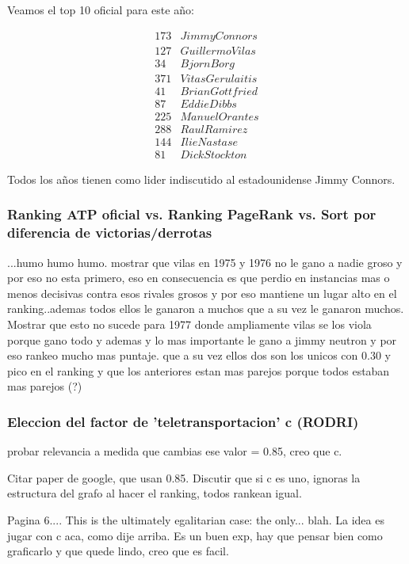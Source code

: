 Veamos el top 10 oficial para este año:

\begin{eqnarray*}
173 & Jimmy Connors \\
127 & Guillermo Vilas \\
34 & Bjorn Borg \\
371 & Vitas Gerulaitis \\
41 & Brian Gottfried \\
87 & Eddie Dibbs \\
225 & Manuel Orantes \\
288 & Raul Ramirez \\
144 & Ilie Nastase \\
81 & Dick Stockton 
\end{eqnarray*}

Todos los años tienen como lider indiscutido al estadounidense Jimmy Connors.

\subsubsection{Ranking ATP oficial vs. Ranking PageRank vs. Sort por diferencia de victorias/derrotas}


...humo humo humo. mostrar que vilas en 1975 y 1976 no le gano a nadie groso y por eso no esta primero, eso en consecuencia es que perdio en instancias mas o menos decisivas contra esos rivales grosos y por eso mantiene un lugar alto en el ranking..ademas todos ellos le ganaron a muchos que a su vez le ganaron muchos. 
Mostrar que esto no sucede para 1977 donde ampliamente vilas se los viola porque gano todo y ademas y lo mas importante le gano a jimmy neutron y por eso rankeo mucho mas puntaje. que a su vez ellos dos son los unicos con 0.30 y pico en el ranking y que los anteriores estan mas parejos porque todos estaban mas parejos (?) 

\subsubsection{Eleccion del factor de 'teletransportacion' c (RODRI)}
probar relevancia a medida que cambias ese valor = 0.85, creo que c.

Citar paper de google, que usan 0.85. Discutir que si c es uno, ignoras la estructura del grafo al hacer el ranking, todos rankean igual.

Pagina 6.... This is the ultimately egalitarian case: the only... blah. La idea es jugar con c aca, como dije arriba. Es un buen exp, hay que pensar bien como graficarlo y que quede lindo, creo que es facil.

